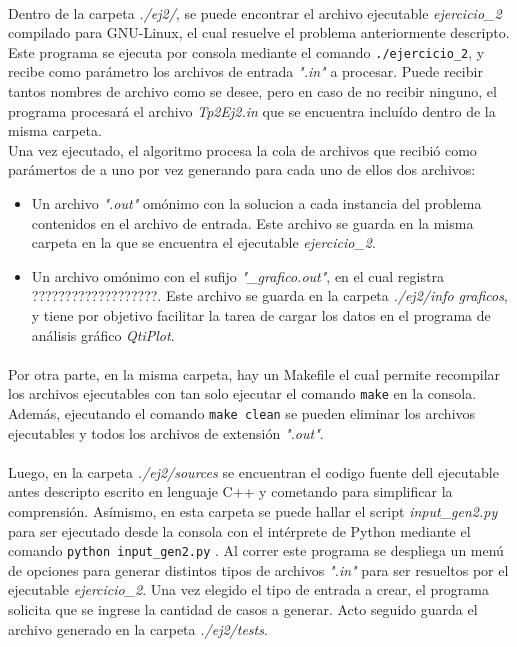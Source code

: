 \paragraph{}
Dentro de la carpeta \textit{./ej2/}, se puede encontrar el archivo ejecutable \textit{ejercicio\_2} compilado para GNU-Linux, el cual resuelve el problema anteriormente descripto. Este programa se ejecuta por consola mediante el comando \texttt{./ejercicio\_2}, y recibe como parámetro los archivos de entrada \textit{".in"} a procesar. Puede recibir tantos nombres de archivo como se desee, pero en caso de no recibir ninguno, el programa procesará el archivo \textit{Tp2Ej2.in} que se encuentra incluído dentro de la misma carpeta. \\
Una vez ejecutado, el algoritmo procesa la cola de archivos que recibió como parámertos de a uno por vez generando para cada uno de ellos dos archivos:
	\begin{itemize}
		\item{Un archivo \textit{".out"} omónimo con la solucion a cada instancia del problema contenidos en el archivo de entrada. Este archivo se guarda en la misma carpeta en la que se encuentra el ejecutable \textit{ejercicio\_2}}.
		\item{Un archivo omónimo con el sufijo \textit{"\_grafico.out"}, en el cual registra ???????????????????. Este archivo se guarda en la carpeta \textit{./ej2/info graficos}, y tiene por objetivo facilitar la tarea de cargar los datos en el programa de análisis gráfico \textit{QtiPlot}}.
	\end{itemize}

\paragraph{}		
Por otra parte, en la misma carpeta, hay un Makefile el cual permite recompilar los archivos ejecutables con tan solo ejecutar el comando \texttt{make} en la consola. Además, ejecutando el comando \texttt{make clean} se pueden eliminar los archivos ejecutables y todos los archivos de extensión \textit{".out"}.

\paragraph{}
Luego, en la carpeta \textit{./ej2/sources} se encuentran el codigo fuente dell ejecutable antes descripto escrito en lenguaje C++ y cometando para simplificar la comprensión. Asímismo, en esta carpeta se puede hallar el script \textit{input\_gen2.py} para ser ejecutado desde la consola con el intérprete de Python mediante el comando \texttt{python input\_gen2.py} . Al correr este programa se despliega un menú de opciones para generar distintos tipos de archivos \textit{".in"} para ser resueltos por el ejecutable \textit{ejercicio\_2}. Una vez elegido el tipo de entrada a crear, el programa solicita que se ingrese la cantidad de casos a generar. Acto seguido guarda el archivo generado en la carpeta \textit{./ej2/tests}.

